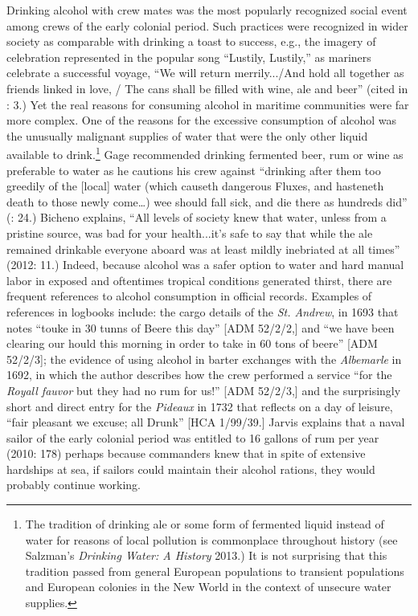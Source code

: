   Drinking alcohol with crew mates was the most popularly recognized social event among crews of the early colonial period. Such practices were recognized in wider society as comparable with drinking a toast to success, e.g., the imagery of celebration represented in the popular song “Lustily, Lustily,” as mariners celebrate a successful voyage, “We will return merrily.../And hold all together as friends linked in love, / The cans shall be filled with wine, ale and beer” (cited in \citealt{Palmer1986}: 3.) Yet the real reasons for consuming alcohol in maritime communities were far more complex. One of the reasons for the excessive consumption of alcohol was the unusually malignant supplies of water that were the only other liquid available to drink.\footnote{The tradition of drinking ale or some form of fermented liquid instead of water for reasons of local pollution is commonplace throughout history (see Salzman’s \textit{Drinking Water: A History} 2013.) It is not surprising that this tradition passed from general European populations to transient populations and European colonies in the New World in the context of unsecure water supplies.}  Gage recommended drinking fermented beer, rum or wine as preferable to water as he cautions his crew against “drinking after them too greedily of the [local] water (which causeth dangerous Fluxes, and hasteneth death to those newly come…) wee should fall sick, and die there as hundreds did” (\citealt{Gage1648}: 24.) Bicheno explains, “All levels of society knew that water, unless from a pristine source, was bad for your health...it’s safe to say that while the ale remained drinkable everyone aboard was at least mildly inebriated at all times” (2012: 11.) Indeed, because alcohol was a safer option to water and hard manual labor in exposed and oftentimes tropical conditions generated thirst, there are frequent references to alcohol consumption in official records. Examples of references in logbooks include: the cargo details of the \textit{St. Andrew}, in 1693 that notes “touke in 30 tunns of Beere this day” [ADM 52/2/2,] and “we have been clearing our hould this morning in order to take in 60 tons of beere” [ADM 52/2/3]; the evidence of using alcohol in barter exchanges with the \textit{Albemarle} in 1692, in which the author describes how the crew performed a service “for the \textit{Royall fauvor} but they had no rum for us!” [ADM 52/2/3,] and the surprisingly short and direct entry for the \textit{Pideaux} in 1732 that reflects on a day of leisure, “fair pleasant we excuse; all Drunk” [HCA 1/99/39.] Jarvis explains that a naval sailor of the early colonial period was entitled to 16 gallons of rum per year (2010: 178) perhaps because commanders knew that in spite of extensive hardships at sea, if sailors could maintain their alcohol rations, they would probably continue working. 

